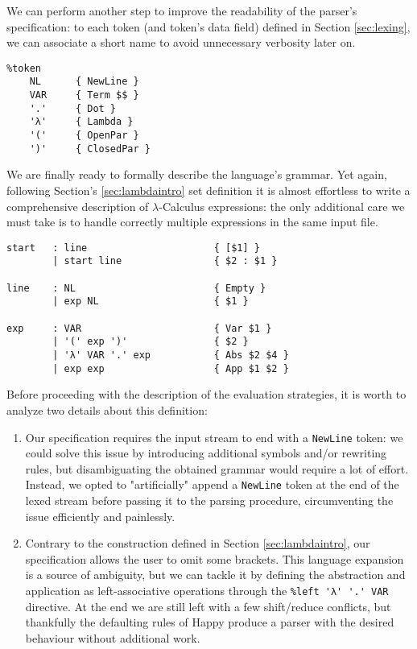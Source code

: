 \documentclass{article}
\begin{document}
We can perform another step to improve the readability of the parser's specification: to each token (and token's data field) defined in Section \ref{sec:lexing}, we can associate a short name to avoid unnecessary verbosity later on.

\begin{lstlisting}
%token
    NL      { NewLine }
    VAR     { Term $$ }
    '.'     { Dot }
    'λ'     { Lambda }
    '('     { OpenPar }
    ')'     { ClosedPar }
\end{lstlisting}

We are finally ready to formally describe the language's grammar. Yet again, following Section's \ref{sec:lambdaintro} set definition it is almost effortless to write a comprehensive description of $\lambda$-Calculus expressions: the only additional care we must take is to handle correctly multiple expressions in the same input file.

\begin{lstlisting}
start   : line                      { [$1] }
        | start line                { $2 : $1 }

line    : NL                        { Empty }
        | exp NL                    { $1 }

exp     : VAR                       { Var $1 }
        | '(' exp ')'               { $2 }
        | 'λ' VAR '.' exp           { Abs $2 $4 }
        | exp exp                   { App $1 $2 }
\end{lstlisting}

Before proceeding with the description of the evaluation strategies, it is worth to analyze two details about this definition:

\begin{enumerate}
    \item Our specification requires the input stream to end with a \lstinline|NewLine| token: we could solve this issue by introducing additional symbols and/or rewriting rules, but disambiguating the obtained grammar would require a lot of effort. Instead, we opted to "artificially" append a \lstinline|NewLine| token at the end of the lexed stream before passing it to the parsing procedure, circumventing the issue efficiently and painlessly.
    \item Contrary to the construction defined in Section \ref{sec:lambdaintro}, our specification allows the user to omit some brackets. This language expansion is a source of ambiguity, but we can tackle it by defining the abstraction and application as left-associative operations through the \lstinline|%left 'λ' '.' VAR| directive. At the end we are still left with a few shift/reduce conflicts, but thankfully the defaulting rules of Happy produce a parser with the desired behaviour without additional work.
\end{enumerate}
\end{document}
